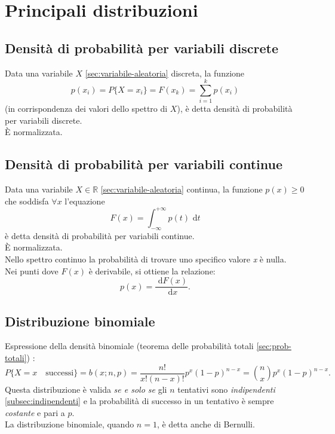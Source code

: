 \chapter {Principali distribuzioni} %
\section{Densità di probabilità per variabili discrete} %
\label{sec:dens-discrete}
Data una variabile $X$ \ref{sec:variabile-aleatoria} discreta, la funzione
\begin{equation}
p({ x }_{ i })=P\{ X={ x }_{ i }\} =F({ x }_{ k })=\sum _{ i=1 }^{ k }{ p({ x }_{ i }) } 
\end{equation}
(in corrispondenza dei valori dello spettro di $X$), è detta densità di probabilità per variabili discrete. \\ \`E normalizzata.

\section{Densità di probabilità per variabili continue} %
\label{sec:dens-continue}
Data una variabile $X \in \mathbb{R}$ \ref{sec:variabile-aleatoria} continua, la funzione $p(x)\ge 0$ che soddisfa $\forall x$ l'equazione
\begin{equation}
F(x)=\int _{ -\infty  }^{ +\infty  }{ p(t)\textrm{ d}t } 
\end{equation}
è detta densità di probabilità per variabili continue. \\ \`E normalizzata. \\ Nello spettro continuo la probabilità di trovare uno specifico valore \emph{x} è nulla. \\ Nei punti dove $F(x)$ è derivabile, si ottiene la relazione:
\begin{equation}
\label{eq:rel-densità-funz}
p\left( x \right) =\frac { \textrm{ d}F\left( x \right)  }{ \textrm{ d}x } .
\end{equation}

\section{Distribuzione binomiale} %
\label{sec:binomiale}
Espressione della densità binomiale (teorema delle probabilità totali \ref{sec:prob-totali}) :
\begin{equation}
P\{ X=x \quad \textrm{successi}\} =b(x;n,p)=\frac { n! }{ x!(n-x)! } { p }^{ x }{ \left( 1-p \right)  }^{ n-x }={n \choose x}{ p }^{ x }{ \left( 1-p \right)  }^{ n-x }.
\end{equation}
Questa distribuzione è valida \emph{se e solo se} gli $n$ tentativi sono \emph{indipendenti} \ref{subsec:indipendenti} e la probabilità di successo in un tentativo è sempre \emph{costante} e pari a $p$. \\ La distribuzione binomiale, quando $n=1$, è detta anche di Bernulli.

